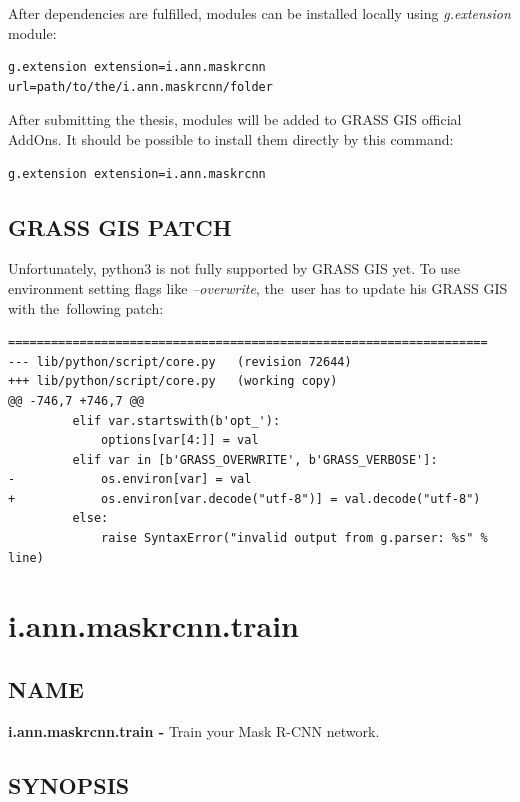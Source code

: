 After dependencies are fulfilled, modules can be installed locally using
\emph{g.extension} module:
{\footnotesize
\begin{lstlisting}
g.extension extension=i.ann.maskrcnn url=path/to/the/i.ann.maskrcnn/folder
\end{lstlisting}
}

After submitting the thesis, modules will be added to GRASS GIS official
AddOns. It should be possible to install them directly by this command:
{\footnotesize
\begin{lstlisting}
g.extension extension=i.ann.maskrcnn
\end{lstlisting}
}

\subsection*{GRASS GIS PATCH}

Unfortunately, python3 is not fully supported by GRASS GIS yet. To use
environment setting flags like \emph{--overwrite}, the~user has to update
his GRASS GIS with the~following patch:

{\footnotesize
\begin{lstlisting}[breaklines=true]
===================================================================
--- lib/python/script/core.py	(revision 72644)
+++ lib/python/script/core.py	(working copy)
@@ -746,7 +746,7 @@
         elif var.startswith(b'opt_'):
             options[var[4:]] = val
         elif var in [b'GRASS_OVERWRITE', b'GRASS_VERBOSE']:
-            os.environ[var] = val
+            os.environ[var.decode("utf-8")] = val.decode("utf-8")
         else:
             raise SyntaxError("invalid output from g.parser: %s" % line)
\end{lstlisting}
}

\clearpage

\section{i.ann.maskrcnn.train}
\label{appendix-train}

\subsection*{NAME}

\textbf{i.ann.maskrcnn.train -} Train your Mask R-CNN network.

\subsection*{SYNOPSIS}

